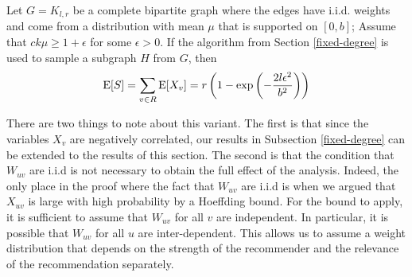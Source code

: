 \begin{thm}
Let $G=K_{l,r}$ be a complete bipartite graph where the edges have i.i.d. weights and come from a distribution with mean $\mu$ that is supported on $[0,b]$; Assume that $ck\mu \geq 1+\epsilon$ for some $\epsilon > 0$. If the algorithm from Section \ref{fixed-degree} is used to sample a subgraph $H$ from $G$, then
\[ \text{E}[S] = \sum_{v\in R} \text{E}[X_v] = r\left(1-\exp\left(-\frac{2l\epsilon^2}{b^2}\right)\right) \]
\end{thm}

There are two things to note about this variant. The first is that
since the variables $X_v$ are negatively correlated, our results in
Subsection \ref{fixed-degree} can be extended to the results of this
section. The second is that the condition that $W_{uv}$ are i.i.d
is not necessary to obtain the full effect of the analysis. Indeed,
the only place in the proof where the fact that $W_{uv}$ are i.i.d
is when we argued that $X_{uv}$ is large with high probability by a
Hoeffding bound. For the bound to apply, it is sufficient to assume
that $W_{uv}$ for all $v$ are independent. In particular, it is
possible that $W_{uv}$ for all $u$ are inter-dependent. This allows
us to assume a weight distribution that depends on the strength of
the recommender and the relevance of the recommendation separately.
